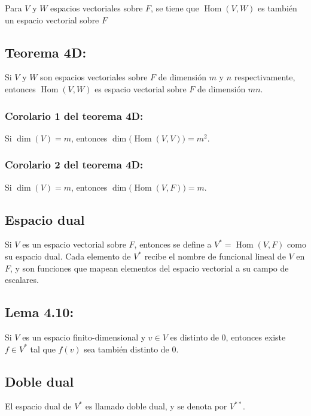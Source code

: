 \documentclass{article}
\DeclareMathOperator{\Hom}{Hom}
\begin{document}
Para $V$ y $W$ espacios vectoriales sobre $F$, se tiene que $\Hom(V,W)$ es también un espacio vectorial sobre $F$

\subsection*{\color{red} Teorema 4D:}

Si $V$ y $W$ son espacios vectoriales sobre $F$ de dimensión $m$ y $n$ respectivamente,  entonces $\Hom(V,W)$ es espacio vectorial sobre $F$ de dimensión $mn$.

\subsubsection*{\color{red} Corolario 1 del teorema 4D:}

Si $\dim(V)=m$, entonces $\dim\big(\Hom(V,V)\big)=m^2$.

\subsubsection*{\color{red} Corolario 2 del teorema 4D:}

Si $\dim(V)=m$, entonces $\dim\big(\Hom(V,F)\big)=m$.

\subsection*{\color{violet} Espacio dual}

Si $V$ es un espacio vectorial sobre $F$, entonces se define a $V^*=\Hom(V,F)$ como su espacio dual. Cada elemento de $V^*$ recibe el nombre de funcional lineal de $V$ en $F$, y son funciones que mapean elementos del espacio vectorial a su campo de escalares.

\subsection*{\color{blue} Lema 4.10:}

Si $V$ es un espacio finito-dimensional y $v\in V$ es distinto de 0, entonces existe $f\in V^*$ tal que $f(v)$ sea también distinto de 0.

\subsection*{\color{violet} Doble dual}

El espacio dual de $V^*$ es llamado doble dual, y se denota por $V^{**}$.
\end{document}
